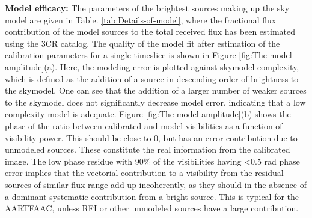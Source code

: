 \documentclass{aa}
\begin{document}
\textbf{Model efficacy:  }The parameters of the  brightest sources making
up  the sky  model are  given  in Table.  \ref{tab:Details-of-model}, where  the
fractional flux contribution of the model  sources to the total received flux has
been estimated using the 3CR catalog. The  quality of the model fit after estimation of
the  calibration  parameters   for  a  single  timeslice  is   shown  in  Figure
\ref{fig:The-model-amplitude}(a). Here, the modeling error is plotted against skymodel complexity, which is defined as the addition of a source in descending order of brightness to the skymodel. One can see that the addition of a larger number of weaker sources to the skymodel does not significantly decrease model error, indicating that a low complexity model is adequate. Figure \ref{fig:The-model-amplitude}(b) shows the phase of the  ratio between calibrated and model visibilities as a function of visibility power. This should be close to 0, but has an error contribution due to unmodeled sources.  These  constitute the real  information from the
calibrated image.  The low  phase residue with  90\% of the  visibilities having
<0.5 rad  phase error  implies that the  vectorial contribution to  a visibility
from the  residual sources of  similar flux range  add up incoherently,  as they
should  in the  absence  of a  dominant  systematic contribution  from a  bright
source. This is typical for the  AARTFAAC, unless RFI or other unmodeled sources
have a large contribution.
\end{document}
